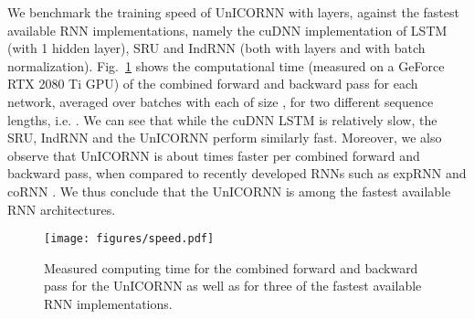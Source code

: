 \documentclass{article}
\newcommand{\fref}[1] {Fig.~\ref{#1}}
\begin{document}
We benchmark the training speed of UnICORNN with  layers, against the fastest available RNN implementations, namely the cuDNN implementation \citep{cudnn_lstm} of LSTM (with 1 hidden layer), SRU and IndRNN (both with  layers and with batch normalization). \fref{fig:speed} shows the computational time (measured on a GeForce RTX 2080 Ti GPU) of the combined forward and backward pass for each network, averaged over  batches with each of size , for two different sequence lengths, i.e. . We can see that while the cuDNN LSTM is relatively slow, the SRU, IndRNN and the UnICORNN perform similarly fast. Moreover, we also observe that UnICORNN is about  times faster per combined forward and backward pass, when compared to recently developed RNNs such as expRNN \cite{exprnn} and coRNN \cite{coRNN}. We thus conclude that the UnICORNN is among the fastest available RNN architectures.

\begin{figure}[ht]
\vskip 0.2in
\begin{center}
\centerline{\texttt{[image: figures/speed.pdf]}}
\caption{Measured computing time for the combined forward and backward pass for the UnICORNN as well as for three of the fastest available RNN implementations.}
\label{fig:speed}
\end{center}
\vskip -0.2in
\end{figure}
\end{document}
